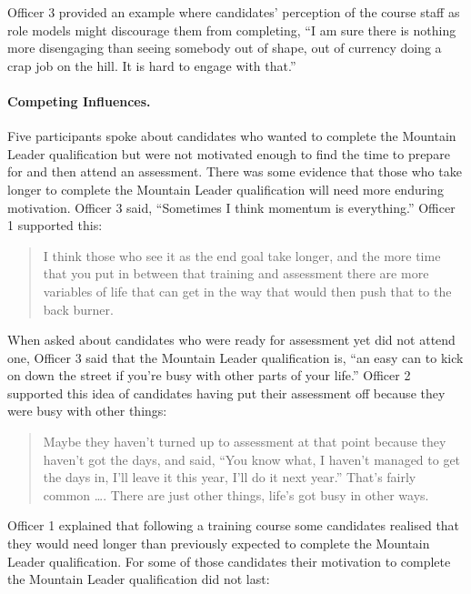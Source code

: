 \documentclass[
  12pt,
  a4paper,
]{book}
\begin{document}
Officer 3 provided an example where candidates' perception of the course staff as role models might discourage them from completing, ``I am sure there is nothing more disengaging than seeing somebody out of shape, out of currency doing a crap job on the hill. It is hard to engage with that.''

\hypertarget{competing-influences.}{%
\paragraph{Competing Influences.}\label{competing-influences.}}

Five participants spoke about candidates who wanted to complete the Mountain Leader qualification but were not motivated enough to find the time to prepare for and then attend an assessment. There was some evidence that those who take longer to complete the Mountain Leader qualification will need more enduring motivation. Officer 3 said, ``Sometimes I think momentum is everything.'' Officer 1 supported this:

\begin{quote}
I think those who see it as the end goal take longer, and the more time that you put in between that training and assessment there are more variables of life that can get in the way that would then push that to the back burner.
\end{quote}

When asked about candidates who were ready for assessment yet did not attend one, Officer 3 said that the Mountain Leader qualification is, ``an easy can to kick on down the street if you're busy with other parts of your life.'' Officer 2 supported this idea of candidates having put their assessment off because they were busy with other things:

\begin{quote}
Maybe they haven't turned up to assessment at that point because they haven't got the days, and said, ``You know what, I haven't managed to get the days in, I'll leave it this year, I'll do it next year.'' That's fairly common \ldots. There are just other things, life's got busy in other ways.
\end{quote}

Officer 1 explained that following a training course some candidates realised that they would need longer than previously expected to complete the Mountain Leader qualification. For some of those candidates their motivation to complete the Mountain Leader qualification did not last:
\end{document}
